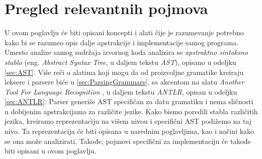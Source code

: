 \chapter{Pregled relevantnih pojmova}
\label{chp:RelevantTerms}

U ovom poglavlju će biti opisani koncepti i alati čije je razumevanje potrebno kako bi se razumeo opis dalje apstrakcije i implementacije samog programa. Umesto analize samog sadržaja izvornog koda analizira se \emph{apstraktno sintaksno stablo} (eng. \emph{Abstract Syntax Tree}, u daljem tekstu \emph{AST}), opisano u odeljku \ref{sec:AST}. Više reči o alatima koji mogu da od proizvoljne gramatike kreiraju leksere i parsere biće u \ref{sec:ParsingGrammars}, sa akcentom na alatu \emph{Another Tool For Language Recognition} \cite{ANTLR}, u daljem tekstu \emph{ANTLR}, opisan u odeljku \ref{sec:ANTLR}. Parser generiše AST specifičan za datu gramatiku i nema sličnosti u dobijenim apstrakcijama za različite jezike. Kako bismo poredili stabla različitih jezika, kreiramo reprezentaciju na višem nivou i specifični AST podižemo na taj nivo. Ta reprezentacija će biti opisana u narednim poglavljima, kao i načini kako se ona može analizirati. Takođe, pojmovi specifični za implementaciju će takođe biti opisani u ovom poglavlju.






